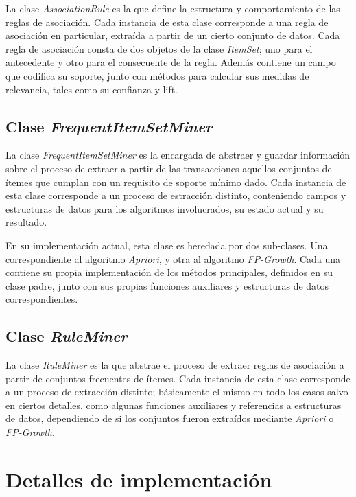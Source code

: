 La clase \textit{AssociationRule} es la que define la estructura y comportamiento de las reglas de asociación. Cada instancia de esta clase corresponde a una regla de asociación en particular, extraída a partir de un cierto conjunto de datos. Cada regla de asociación consta de dos objetos de la clase \textit{ItemSet}; uno para el antecedente y otro para el consecuente de la regla. Además contiene un campo que codifica su soporte, junto con métodos para calcular sus medidas de relevancia, tales como su confianza y lift.

\subsection{Clase \textit{FrequentItemSetMiner}}

La clase \textit{FrequentItemSetMiner} es la encargada de abstraer y guardar información sobre el proceso de extraer a partir de las transacciones aquellos conjuntos de ítemes que cumplan con un requisito de soporte mínimo dado. Cada instancia de esta clase corresponde a un proceso de estracción distinto, conteniendo campos y estructuras de datos para los algoritmos involucrados, su estado actual y su resultado.

En su implementación actual, esta clase es heredada por dos sub-clases. Una correspondiente al algoritmo \textit{Apriori}, y otra al algoritmo \textit{FP-Growth}. Cada una contiene su propia implementación de los métodos principales, definidos en su clase padre, junto con sus propias funciones auxiliares y estructuras de datos correspondientes.

\subsection{Clase \textit{RuleMiner}}

La clase \textit{RuleMiner} es la que abstrae el proceso de extraer reglas de asociación a partir de conjuntos frecuentes de ítemes. Cada instancia de esta clase corresponde a un proceso de extracción distinto; básicamente el mismo en todo los casos salvo en ciertos detalles, como algunas funciones auxiliares y referencias a estructuras de datos, dependiendo de si los conjuntos fueron extraídos mediante \textit{Apriori} o \textit{FP-Growth}.

\section{Detalles de implementación}

